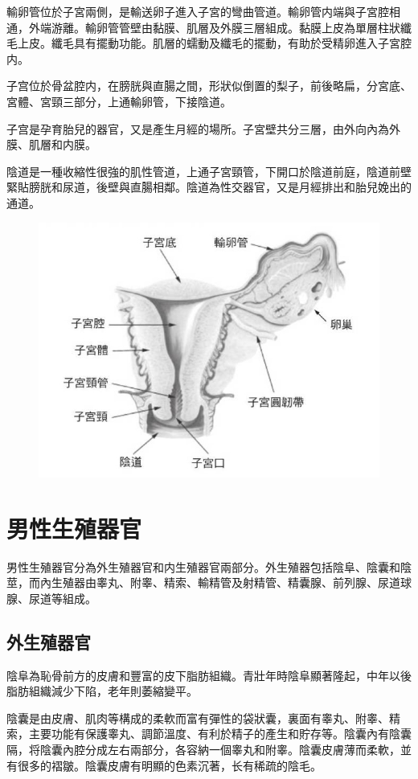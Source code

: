 \documentclass[12pt,UTF8]{ctexbook}
\begin{document}
輸卵管位於子宮兩側，是輸送卵子進入子宮的彎曲管道。輸卵管内端與子宮腔相通，外端游離。輸卵管管壁由黏膜、肌層及外膜三層組成。黏膜上皮為單層柱狀纖毛上皮。纖毛具有擺動功能。肌層的蠕動及纖毛的擺動，有助於受精卵進入子宮腔内。

子宫位於骨盆腔内，在膀胱與直腸之間，形狀似倒置的梨子，前後略扁，分宮底、宮體、宮頸三部分，上通輸卵管，下接陰道。

子宫是孕育胎兒的器官，又是產生月經的場所。子宮壁共分三層，由外向內為外膜、肌層和内膜。

陰道是一種收縮性很強的肌性管道，上通子宮頸管，下開口於陰道前庭，陰道前壁緊貼膀胱和尿道，後壁與直腸相鄰。陰道為性交器官，又是月經排出和胎兒娩出的通道。

\begin{figure}
	\centering
	\includegraphics[width=0.7\linewidth]{Images/3}
	\caption{}
\end{figure}

\section{男性生殖器官}

男性生殖器官分為外生殖器官和内生殖器官兩部分。外生殖器包括陰阜、陰囊和陰莖，而內生殖器由睾丸、附睾、精索、輸精管及射精管、精囊腺、前列腺、尿道球腺、尿道等組成。

\subsection{外生殖器官}

陰阜為恥骨前方的皮膚和豐富的皮下脂肪組織。青壯年時陰阜顯著隆起，中年以後脂肪組織減少下陷，老年則萎縮變平。

陰囊是由皮膚、肌肉等構成的柔軟而富有彈性的袋狀囊，裏面有睾丸、附睾、精索，主要功能有保護睾丸、調節溫度、有利於精子的產生和貯存等。陰囊內有陰囊隔，将陰囊內腔分成左右兩部分，各容納一個睾丸和附睾。陰囊皮膚薄而柔軟，並有很多的褶皺。陰囊皮膚有明顯的色素沉著，长有稀疏的陰毛。
\end{document}
